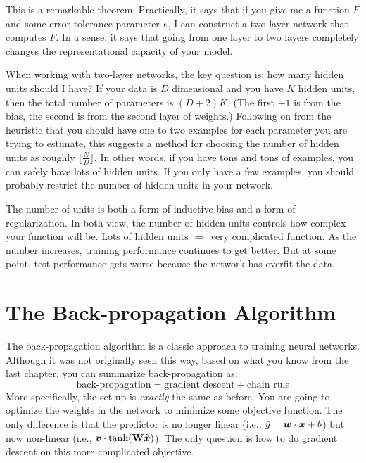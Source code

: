This is a remarkable theorem.  Practically, it says that if you give
me a function $F$ and some error tolerance parameter $\epsilon$, I can
construct a two layer network that computes $F$.  In a sense, it says
that going from one layer to two layers completely changes the
representational capacity of your model.

When working with two-layer networks, the key question is: how many
hidden units should I have?  If your data is $D$ dimensional and you
have $K$ hidden units, then the total number of parameters is
$(D+2)K$.  (The first $+1$ is from the bias, the second is from the
second layer of weights.)  Following on from the heuristic that you
should have one to two examples for each parameter you are trying to
estimate, this suggests a method for choosing the number of hidden
units as roughly $\lfloor \frac N D \rfloor$.  In other words, if you
have tons and tons of examples, you can safely have lots of hidden
units.  If you only have a few examples, you should probably restrict
the number of hidden units in your network.

The number of units is both a form of inductive bias and a form of
regularization.  In both view, the number of hidden units controls how
complex your function will be.  Lots of hidden units $\Rightarrow$
very complicated function.  %
As the number increases, training performance continues
to get better.  But at some point, test performance gets worse because
the network has overfit the data.

\section{The Back-propagation Algorithm}

The back-propagation algorithm is a classic approach to training
neural networks.  Although it was not originally seen this way, based
on what you know from the last chapter, you can summarize
back-propagation as:
%
\begin{equation}
\text{back-propagation} = \text{gradient descent} + \text{chain rule}
\end{equation}
%
More specifically, the set up is \emph{exactly} the same as before.
You are going to optimize the weights in the network to minimize some
objective function.  The only difference is that the predictor is no
longer linear (i.e., $\hat y = {\boldsymbol{w}} \cdot {\boldsymbol{x}}+b$) but now non-linear
(i.e., $\boldsymbol{v} \cdot \tanh( \text{\bf W} \hat{{\boldsymbol{x}}} )$).  The only question
is how to do gradient descent on this more complicated objective.

